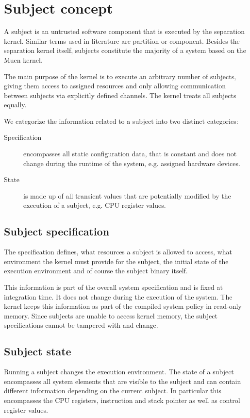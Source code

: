 \section{Subject concept}
A subject is an untrusted software component that is executed by the separation
kernel. Similar terms used in literature are partition or component. Besides the
separation kernel itself, subjects constitute the majority of a system based on
the Muen kernel.

The main purpose of the kernel is to execute an arbitrary number of subjects,
giving them access to assigned resources and only allowing communication between
subjects via explicitly defined channels. The kernel treats all subjects equally.

We categorize the information related to a subject into two distinct categories:

\begin{description}
	\item[Specification] encompasses all static configuration data, that is
		constant and does not change during the runtime of the system, e.g.
		assigned hardware devices.
	\item[State] is made up of all transient values that are potentially modified
		by the execution of a subject, e.g. CPU register values.
\end{description}

\subsection{Subject specification}
The specification defines, what resources a subject is allowed to access, what
environment the kernel must provide for the subject, the initial state of the
execution environment and of course the subject binary itself.

This information is part of the overall system specification and is fixed at
integration time. It does not change during the execution of the system. The
kernel keeps this information as part of the compiled system policy in read-only
memory. Since subjects are unable to access kernel memory, the subject
specifications cannot be tampered with and change.

\subsection{Subject state}
Running a subject changes the execution environment. The state of a subject
encompasses all system elements that are visible to the subject and can contain
different information depending on the current subject. In particular this
encompasses the CPU registers, instruction and stack pointer as well as control
register values.

